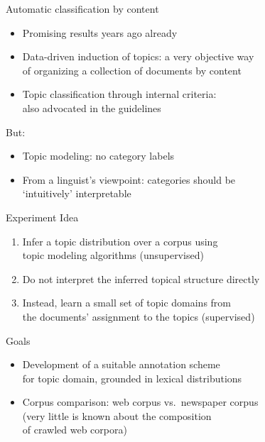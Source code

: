 \documentclass{beamer}
\begin{document}
\begin{frame}
  {Automatic classification by content}  
  \begin{itemize}
    \item Promising results years ago already \citep{Sebastiani2002}
    \item \alert{Data-driven induction of topics}: a very objective way\\
      of organizing a collection of documents by content
    \item Topic classification through internal criteria:\\ also advocated in the \citet{EAGLES1996} guidelines
   \end{itemize}
  
  \vspace{0.5cm}     
\pause
  But:
  \begin{itemize}
    \item \alert{Topic modeling}: no category labels
    \item From a linguist's viewpoint: categories should be\\
      `intuitively' interpretable
  \end{itemize}
  \end{frame}


  \begin{frame}
    {Experiment}
    Idea
    \begin{enumerate}
      \item Infer a topic distribution over a corpus using\\
	topic modeling algorithms (\alert{unsupervised})
      \item Do not interpret the inferred topical structure directly
      \item Instead, learn a small set of topic domains from\\
	the documents' assignment to the topics (\alert{supervised})
    \end{enumerate}
\pause
    Goals
    \begin{itemize}
      \item Development of a suitable annotation scheme\\
	for topic domain, grounded in lexical distributions
      \item Corpus comparison: web corpus vs.\ newspaper corpus\\
       (very little is known about the composition\\
       of crawled web corpora)
    \end{itemize}
    \end{frame}
\end{document}
